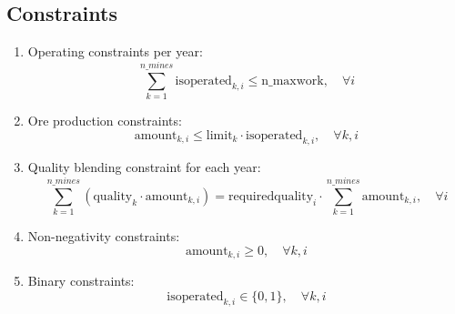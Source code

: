 \documentclass{article}
\begin{document}
\subsection*{Constraints}
\begin{enumerate}
    \item Operating constraints per year:
    \[
    \sum_{k=1}^{n\_mines} \text{isoperated}_{k,i} \leq \text{n\_maxwork}, \quad \forall i
    \]
    \item Ore production constraints:
    \[
    \text{amount}_{k,i} \leq \text{limit}_k \cdot \text{isoperated}_{k,i}, \quad \forall k, i
    \]
    \item Quality blending constraint for each year:
    \[
    \sum_{k=1}^{n\_mines} \left( \text{quality}_k \cdot \text{amount}_{k,i} \right) = \text{requiredquality}_i \cdot \sum_{k=1}^{n\_mines} \text{amount}_{k,i}, \quad \forall i
    \]
    \item Non-negativity constraints:
    \[
    \text{amount}_{k,i} \geq 0, \quad \forall k, i
    \]
    \item Binary constraints:
    \[
    \text{isoperated}_{k,i} \in \{0, 1\}, \quad \forall k, i
    \]
\end{enumerate}
\end{document}
